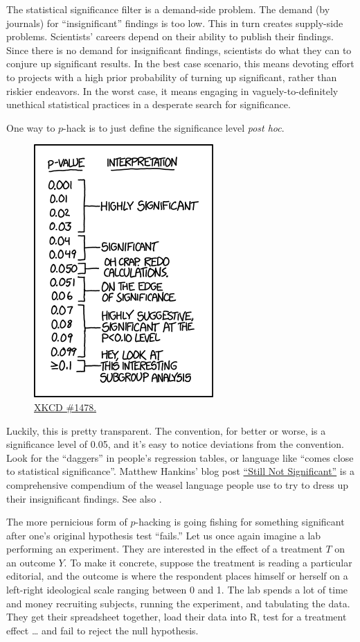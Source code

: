 \documentclass[
  12pt,
  oneside,openany]{book}
\begin{document}
The statistical significance filter is a demand-side problem. The demand (by journals) for ``insignificant'' findings is too low. This in turn creates supply-side problems. Scientists' careers depend on their ability to publish their findings. Since there is no demand for insignificant findings, scientists do what they can to conjure up significant results. In the best case scenario, this means devoting effort to projects with a high prior probability of turning up significant, rather than riskier endeavors. In the worst case, it means engaging in vaguely-to-definitely unethical statistical practices in a desperate search for significance.

One way to \(p\)-hack is to just define the significance level \emph{post hoc}.

\begin{figure}
\centering
\includegraphics{p_values.png}
\caption{\href{https://xkcd.com/1478/}{XKCD \#1478.}}
\end{figure}

Luckily, this is pretty transparent. The convention, for better or worse, is a significance level of 0.05, and it's easy to notice deviations from the convention. Look for the ``daggers'' in people's regression tables, or language like ``comes close to statistical significance''. Matthew Hankins' blog post \href{https://mchankins.wordpress.com/2013/04/21/still-not-significant-2/}{``Still Not Significant''} is a comprehensive compendium of the weasel language people use to try to dress up their insignificant findings. See also \citet{pritschet2016marginally}.

The more pernicious form of \(p\)-hacking is going fishing for something significant after one's original hypothesis test ``fails.'' Let us once again imagine a lab performing an experiment. They are interested in the effect of a treatment \(T\) on an outcome \(Y\). To make it concrete, suppose the treatment is reading a particular editorial, and the outcome is where the respondent places himself or herself on a left-right ideological scale ranging between 0 and 1. The lab spends a lot of time and money recruiting subjects, running the experiment, and tabulating the data. They get their spreadsheet together, load their data into R, test for a treatment effect \ldots{} and fail to reject the null hypothesis.
\end{document}
